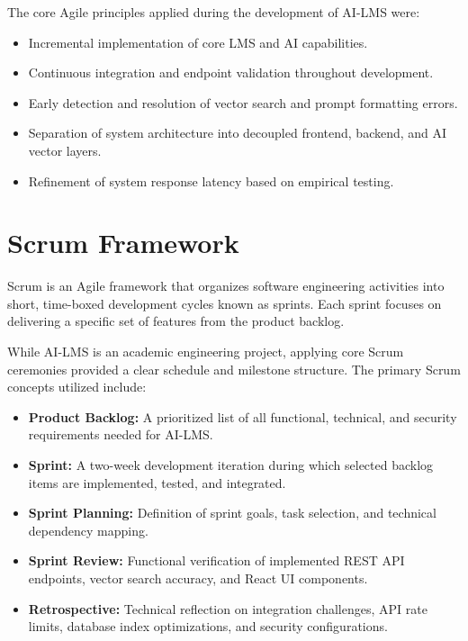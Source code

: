 The core Agile principles applied during the development of AI-LMS were:

\begin{itemize}
    \item Incremental implementation of core LMS and AI capabilities.
    \item Continuous integration and endpoint validation throughout development.
    \item Early detection and resolution of vector search and prompt formatting errors.
    \item Separation of system architecture into decoupled frontend, backend, and AI vector layers.
    \item Refinement of system response latency based on empirical testing.
\end{itemize}

\section{Scrum Framework}

Scrum is an Agile framework that organizes software engineering activities into short, time-boxed development cycles known as sprints. Each sprint focuses on delivering a specific set of features from the product backlog.

While AI-LMS is an academic engineering project, applying core Scrum ceremonies provided a clear schedule and milestone structure. The primary Scrum concepts utilized include:

\begin{itemize}
    \item \textbf{Product Backlog:} A prioritized list of all functional, technical, and security requirements needed for AI-LMS.
    
    \item \textbf{Sprint:} A two-week development iteration during which selected backlog items are implemented, tested, and integrated.
    
    \item \textbf{Sprint Planning:} Definition of sprint goals, task selection, and technical dependency mapping.
    
    \item \textbf{Sprint Review:} Functional verification of implemented REST API endpoints, vector search accuracy, and React UI components.
    
    \item \textbf{Retrospective:} Technical reflection on integration challenges, API rate limits, database index optimizations, and security configurations.
\end{itemize}

